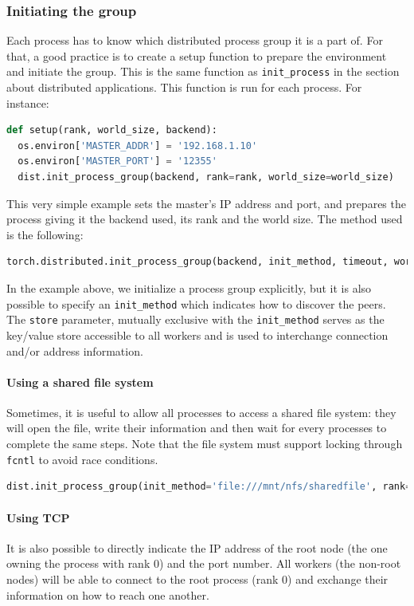 \documentclass{article}
\begin{document}
\subsubsection{Initiating the group}
Each process has to know which distributed process group it is a part of. For that, a good practice is to create a setup function to prepare the environment and initiate the group. This is the same function as \lstinline{init_process} in the section about distributed applications. This function is run for each process. For instance:
\begin{lstlisting}[language=Python]
def setup(rank, world_size, backend):
  os.environ['MASTER_ADDR'] = '192.168.1.10'
  os.environ['MASTER_PORT'] = '12355'
  dist.init_process_group(backend, rank=rank, world_size=world_size)
\end{lstlisting}
This very simple example sets the master's IP address and port, and prepares the process giving it the backend used, its rank and the world size.
The method used is the following:
\begin{lstlisting}[language=Python]
torch.distributed.init_process_group(backend, init_method, timeout, world_size, rank, store, group_name, pg_options)
\end{lstlisting}
In the example above, we initialize a process group explicitly, but it is also possible to specify an \lstinline{init_method} which indicates how to discover the peers. The \lstinline{store} parameter, mutually exclusive with the \lstinline{init_method} serves as the key/value store accessible to all workers and is used to interchange connection and/or address information.

\paragraph{Using a shared file system}
Sometimes, it is useful to allow all processes to access a shared file system: they will open the file, write their information and then wait for every processes to complete the same steps. Note that the file system must support locking through \lstinline{fcntl} to avoid race conditions.

\begin{lstlisting}[language=Python]
dist.init_process_group(init_method='file:///mnt/nfs/sharedfile', rank=rank, world_size=size)
\end{lstlisting}

\paragraph{Using TCP}
It is also possible to directly indicate the IP address of the root node (the one owning the process with rank 0) and the port number. All workers (the non-root nodes) will be able to connect to the root process (rank 0) and exchange their information on how to reach one another.
\end{document}
